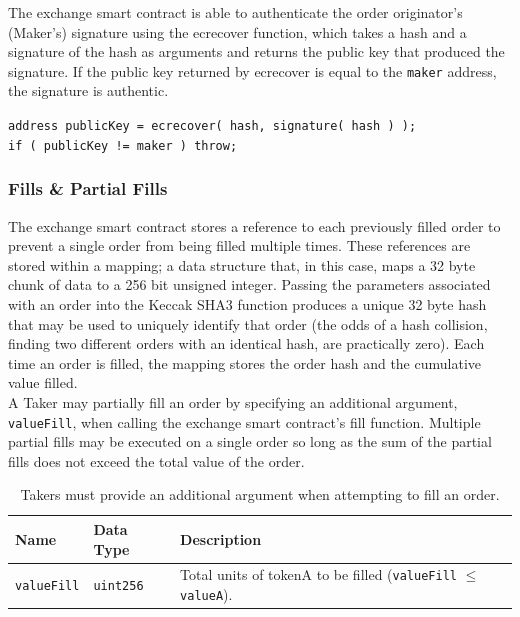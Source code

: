 \documentclass[10pt]{article}
\begin{document}
The exchange smart contract is able to authenticate the order originator's (Maker's) signature using the ecrecover function, which takes a hash and a signature of the hash as arguments and returns the public key that produced the signature. If the public key returned by ecrecover is equal to the \texttt{maker} address, the signature is authentic.

\begin{center}
\noindent \texttt{address publicKey = ecrecover( hash, signature( hash ) );} \\
\noindent \texttt{if ( publicKey != maker )  throw;}
\end{center}

\subsubsection{Fills \& Partial Fills}

The exchange smart contract stores a reference to each previously filled order to prevent a single order from being filled multiple times. These references are stored within a mapping; a data structure that, in this case, maps a 32 byte chunk of data to a 256 bit unsigned integer. Passing the parameters associated with an order into the Keccak SHA3 function produces a unique 32 byte hash that may be used to uniquely identify that order (the odds of a hash collision, finding two different orders with an identical hash, are practically zero). Each time an order is filled, the mapping stores the order hash and the cumulative value filled. \\

\noindent A Taker may partially fill an order by specifying an additional argument, \texttt{valueFill}, when calling the exchange smart contract's fill function. Multiple partial fills may be executed on a single order so long as the sum of the partial fills does not exceed the total value of the order.

\begin{table}[h]
\centering
\caption{Takers must provide an additional argument when attempting to fill an order.}
\label{table:table3}
\begin{tabular}{|l|l|l|}
\hline
\textbf{Name} & \textbf{Data Type} & \textbf{Description} \\ \hline
\texttt{valueFill} & \texttt{uint256} & Total units of tokenA to be filled (\texttt{valueFill} $\leq$ \texttt{valueA}). \\ \hline
\end{tabular}
\end{table}
\end{document}
